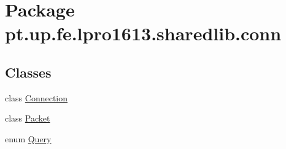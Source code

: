 \hypertarget{namespacept_1_1up_1_1fe_1_1lpro1613_1_1sharedlib_1_1conn}{}\section{Package pt.\+up.\+fe.\+lpro1613.\+sharedlib.\+conn}
\label{namespacept_1_1up_1_1fe_1_1lpro1613_1_1sharedlib_1_1conn}
\subsection*{Classes}
\begin{DoxyCompactItemize}
\item 
class \hyperlink{classpt_1_1up_1_1fe_1_1lpro1613_1_1sharedlib_1_1conn_1_1_connection}{Connection}
\item 
class \hyperlink{classpt_1_1up_1_1fe_1_1lpro1613_1_1sharedlib_1_1conn_1_1_packet}{Packet}
\item 
enum \hyperlink{enumpt_1_1up_1_1fe_1_1lpro1613_1_1sharedlib_1_1conn_1_1_query}{Query}
\end{DoxyCompactItemize}
